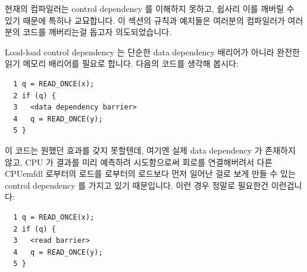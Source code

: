 현재의 컴파일러는 control dependency 를 이해하지 못하고, 쉽사리 이를 깨버릴 수
있기 때문에 특히나 교묘합니다.
이 섹션의 규칙과 예지들은 여러분의 컴파일러가 여러분의 코드를 깨버리는걸 돕고자
의도되었습니다.

Load-load control dependency 는 단순한 data dependency 배리어가 아니라 완전한
읽기 메모리 배리어를 필요로 합니다.
다음의 코드를 생각해 봅시다:

\vspace{5pt}
\begin{minipage}[t]{\columnwidth}
\scriptsize
\begin{verbatim}
  1 q = READ_ONCE(x);
  2 if (q) {
  3   <data dependency barrier>
  4   q = READ_ONCE(y);
  5 }
\end{verbatim}
\end{minipage}
\vspace{5pt}

이 코드는 원했던 효과를 갖지 못할텐데, 여기엔 실제 data dependency 가 존재하지
않고, CPU 가 결과를 미리 예측하려 시도함으로써 회로를 연결해버려서 다른
CPUemfdl  로부터의 로드를  로부터의 로드보다 먼저 일어난 걸로 보게
만들 수 있는 control dependency 를 가지고 있기 때문입니다.
이런 경우 정말로 필요한건 이런겁니다:

\vspace{5pt}
\begin{minipage}[t]{\columnwidth}
\scriptsize
\begin{verbatim}
  1 q = READ_ONCE(x);
  2 if (q) {
  3   <read barrier>
  4   q = READ_ONCE(y);
  5 }
\end{verbatim}
\end{minipage}
\vspace{5pt}

